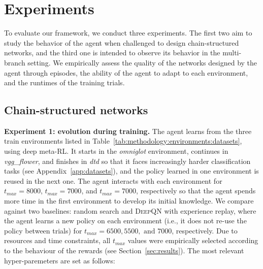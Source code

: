 \section{Experiments}\label{sec:experiments}


To evaluate our framework, we conduct three experiments. The first two aim to study the behavior of the agent when challenged to design chain-structured networks, and the third one is intended to observe its behavior in the multi-branch setting. We empirically assess the quality of the networks designed by the agent through episodes, the ability of the agent to adapt to each environment, and the runtimes of the training trials.

\subsection{Chain-structured networks} \label{sec:experiments:chain}

\textbf{Experiment 1: evolution during training.} The agent learns from the three train environments listed in Table~\ref{tab:methodology:environments:datasets}, using deep meta-RL. It starts in the \textit{omniglot} environment, continues in \textit{vgg\_flower}, and finishes in \textit{dtd} so that it faces increasingly harder classification tasks (see Appendix~\ref{app:datasets}), and the policy learned in one environment is reused in the next one. The agent interacts with each environment for $t_{max}=8000$, $t_{max}=7000$, and $t_{max}=7000$, respectively so that the agent spends more time in the first environment to develop its initial knowledge.
We compare against two baselines: random search and \textsc{DeepQN} with experience replay, where the agent learns a new policy on each environment (i.e., it does not re-use the policy between trials) for $t_{max}=6500, 5500, \text{ and }7000$, respectively. Due to resources and time constraints, all $t_{max}$ values were empirically selected according to the behaviour of the rewards (see Section~\ref{sec:results}). The most relevant hyper-paremeters are set as follows:

